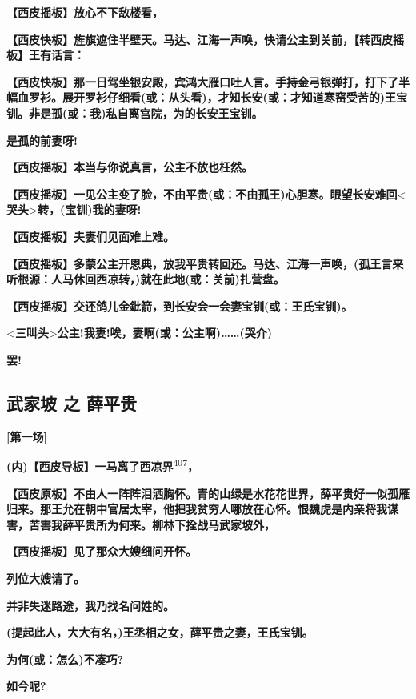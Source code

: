 \textbf{【西皮摇板】放心不下敌楼看，}

\textbf{【西皮快板】旌旗遮住半壁天。马达、江海一声唤，快请公主到关前，【转西皮摇板】王有话言：}

\textbf{【西皮快板】那一日驾坐银安殿，宾鸿大雁口吐人言。手持金弓银弹打，打下了半幅血罗衫。展开罗衫仔细看(或：从头看)，才知长安(或：才知道寒窑受苦的)王宝钏。非是孤(或：我)私自离宫院，为的长安王宝钏。}

\textbf{是孤的前妻呀!}

\textbf{【西皮摇板】本当与你说真言，公主不放也枉然。}

\textbf{【西皮摇板】一见公主变了脸，不由平贵(或：不由孤王)心胆寒。眼望长安难回}\textless{}\textbf{哭头}\textgreater{}\textbf{转，(宝钏)我的妻呀!}

\textbf{【西皮摇板】夫妻们见面难上难。}

\textbf{【西皮摇板】多蒙公主开恩典，放我平贵转回还。马达、江海一声唤，(孤王言来听根源：人马休回西凉转，)就在此地(或：关前)扎营盘。}

\textbf{【西皮摇板】交还鸽儿金鈚箭，到长安会一会妻宝钏(或：王氏宝钏)。}

\textless{}\textbf{三叫头}\textgreater{}\textbf{公主!我妻!唉，妻啊(或：公主啊)\ldots{}\ldots{}(哭介)}

\textbf{罢!}

\hypertarget{ux6b66ux5bb6ux5761-ux4e4b-ux859bux5e73ux8d35}{%
\subsection{武家坡 之
薛平贵}\label{ux6b66ux5bb6ux5761-ux4e4b-ux859bux5e73ux8d35}}

\textbf{{[}第一场{]}}

\textbf{(内)【西皮导板】一马离了西凉界}\protect\hyperlink{fn407}{\textsuperscript{407}}\textbf{，}

\textbf{【西皮原板】不由人一阵阵泪洒胸怀。青的山绿是水花花世界，薛平贵好一似孤雁归来。那王允在朝中官居太宰，他把我贫穷人哪放在心怀。恨魏虎是内亲将我谋害，苦害我薛平贵所为何来。柳林下拴战马武家坡外，}

\textbf{【西皮摇板】见了那众大嫂细问开怀。}

\textbf{列位大嫂请了。}

\textbf{并非失迷路途，我乃找名问姓的。}

\textbf{(提起此人，大大有名，)王丞相之女，薛平贵之妻，王氏宝钏。}

\textbf{为何(或：怎么)不凑巧?}

\textbf{如今呢?}

